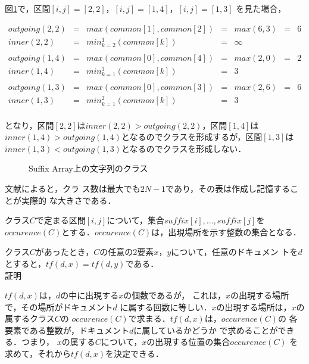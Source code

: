 図\ref{suffix_array_class}で，区間$[i,j]=[2,2]$，$[i,j]=[1,4]$，$[i,j]=[1,3]$
を見た場合，
 \begin{center}
  \[
  \begin{array}{lllllll}
 outgoing(2,2) & = & max(common[1],common[2])   & = & max(6,3) & = & 6\\
 inner(2,2)    & = & min_{k=2}^{1}(common[k])   & = & ∞\\
   \\
 outgoing(1,4) & = & max(common[0],common[4])   & = & max(2,0) & = & 2\\
 inner(1,4)    & = & min_{k=1}^{3}(common[k])   & = & 3\\
   \\
 outgoing(1,3) & = & max(common[0],common[3])   & = & max(2,6) & = & 6\\
 inner(1,3)    & = & min_{k=1}^{2}(common[k])   & = & 3\\
   \end{array}
  \]
 \end{center}
となり，区間$[2,2]$は$inner(2,2)>outgoing(2,2)$，区間$[1,4]$は
$inner(1,4)>outgoing(1,4)$となるのでクラスを形成するが，区間$[1,3]$は
$inner(1,3)<outgoing(1,3)$となるのでクラスを形成しない．

 \begin{figure}[htbp]
  \begin{center}
   \epsfxsize=7cm
   
   \caption{Suffix Array上の文字列のクラス}
   \label{suffix_array_class}
  \end{center}
 \end{figure}

文献\cite{DF1}によると，クラ
ス数は最大でも$2N-1$であり，その表は作成し記憶することが実際的
な大きさである．\\

\par
[$occurence(C)$の定義]\par
クラス$C$で定まる区間$[i,j]$について，集合${suffix[i],...,suffix[j]}$を
$occurence(C)$とする．$occurence(C)$は，出現場所を示す整数の集合となる．\\


\par
[性質1]\par
クラス$C$があったとき，$C$の任意の2要素$x$，$y$について，任意のドキュメン
トを$d$とすると，$tf(d,x) = tf(d,y)$である．\\


証明\par
$tf(d, x)$は，$d$の中に出現する$x$の個数であるが，
これは，$x$の出現する場所で，その場所がドキュメント$d$
に属する回数に等しい．$x$の出現する場所は，$x$の属するクラス$C$の
$occurence(C)$で求まる．$tf(d, x)$は，$occurence(C)$の
各要素である整数が，ドキュメント$d$に属しているかどうか
で求めることができる．つまり，
$x$の属する$C$について，$x$の出現する位置の集合$occurence(C)$
を求めて，それから$tf(d, x)$を決定できる．

